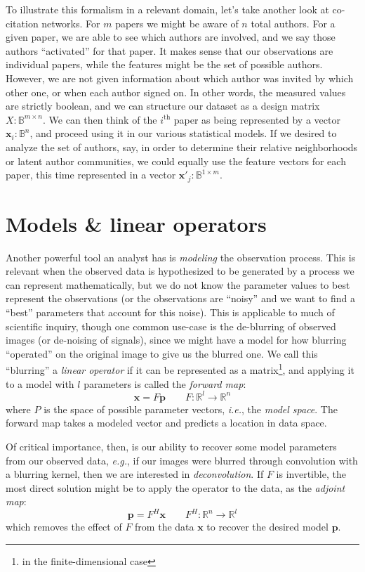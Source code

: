 \documentclass[%
	12pt,
		oneside,
		letterpaper
]{book}
\begin{document}
To illustrate this formalism in a relevant domain, let's take another
look at co-citation networks. For \(m\) papers we might be aware of
\(n\) total authors. For a given paper, we are able to see which authors
are involved, and we say those authors ``activated'' for that paper. It
makes sense that our observations are individual papers, while the
features might be the set of possible authors. However, we are not given
information about which author was invited by which other one, or when
each author signed on. In other words, the measured values are strictly
boolean, and we can structure our dataset as a design matrix
\(X:\mathbb{B}^{m\times n}\). We can then think of the
\(i^{\mathrm{th}}\) paper as being represented by a vector
\(\mathbf{x}_i:\mathbb{B}^n\), and proceed using it in our various
statistical models. If we desired to analyze the set of authors, say, in
order to determine their relative neighborhoods or latent author
communities, we could equally use the feature vectors for each paper,
this time represented in a vector
\(\mathbf{x}'_j:\mathbb{B}^{1\times m}\).

\section{Models \& linear operators}\label{sec-lin-ops}

Another powerful tool an analyst has is \emph{modeling} the observation
process. This is relevant when the observed data is hypothesized to be
generated by a process we can represent mathematically, but we do not
know the parameter values to best represent the observations (or the
observations are ``noisy'' and we want to find a ``best'' parameters
that account for this noise). This is applicable to much of scientific
inquiry, though one common use-case is the de-blurring of observed
images (or de-noising of signals), since we might have a model for how
blurring ``operated'' on the original image to give us the blurred one.
We call this ``blurring'' a \emph{linear operator} if it can be
represented as a matrix\footnote{in the finite-dimensional case}, and
applying it to a model with \(l\) parameters is called the \emph{forward
map}:
\[\mathbf{x} = F\mathbf{p}\qquad F:\mathbb{R}^{l}\rightarrow \mathbb{R}^n\]
where \(P\) is the space of possible parameter vectors, \emph{i.e.}, the
\emph{model space}. The forward map takes a modeled vector and predicts
a location in data space.

Of critical importance, then, is our ability to recover some model
parameters from our observed data, \emph{e.g.}, if our images were
blurred through convolution with a blurring kernel, then we are
interested in \emph{deconvolution}. If \(F\) is invertible, the most
direct solution might be to apply the operator to the data, as the
\emph{adjoint map}:
\[ \mathbf{p} = F^H\mathbf{x}\qquad F^H:\mathbb{R}^{n}\rightarrow \mathbb{R}^l\]
which removes the effect of \(F\) from the data \(\mathbf{x}\) to
recover the desired model \(\mathbf{p}\).
\end{document}
